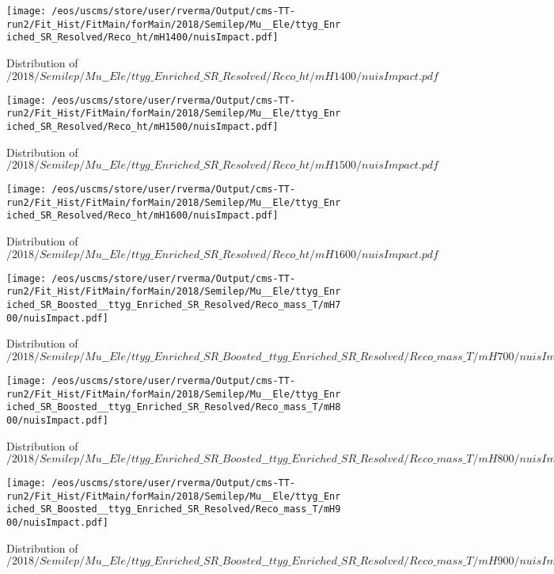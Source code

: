 \begin{figure}
\centering
\texttt{[image: /eos/uscms/store/user/rverma/Output/cms-TT-run2/Fit\_Hist/FitMain/forMain/2018/Semilep/Mu\_\_Ele/ttyg\_Enriched\_SR\_Resolved/Reco\_ht/mH1400/nuisImpact.pdf]}
\caption{Distribution of $/2018/Semilep/Mu\_\_Ele/ttyg\_Enriched\_SR\_Resolved/Reco\_ht/mH1400/nuisImpact.pdf$}
\end{figure}

\begin{figure}
\centering
\texttt{[image: /eos/uscms/store/user/rverma/Output/cms-TT-run2/Fit\_Hist/FitMain/forMain/2018/Semilep/Mu\_\_Ele/ttyg\_Enriched\_SR\_Resolved/Reco\_ht/mH1500/nuisImpact.pdf]}
\caption{Distribution of $/2018/Semilep/Mu\_\_Ele/ttyg\_Enriched\_SR\_Resolved/Reco\_ht/mH1500/nuisImpact.pdf$}
\end{figure}

\begin{figure}
\centering
\texttt{[image: /eos/uscms/store/user/rverma/Output/cms-TT-run2/Fit\_Hist/FitMain/forMain/2018/Semilep/Mu\_\_Ele/ttyg\_Enriched\_SR\_Resolved/Reco\_ht/mH1600/nuisImpact.pdf]}
\caption{Distribution of $/2018/Semilep/Mu\_\_Ele/ttyg\_Enriched\_SR\_Resolved/Reco\_ht/mH1600/nuisImpact.pdf$}
\end{figure}

\begin{figure}
\centering
\texttt{[image: /eos/uscms/store/user/rverma/Output/cms-TT-run2/Fit\_Hist/FitMain/forMain/2018/Semilep/Mu\_\_Ele/ttyg\_Enriched\_SR\_Boosted\_\_ttyg\_Enriched\_SR\_Resolved/Reco\_mass\_T/mH700/nuisImpact.pdf]}
\caption{Distribution of $/2018/Semilep/Mu\_\_Ele/ttyg\_Enriched\_SR\_Boosted\_\_ttyg\_Enriched\_SR\_Resolved/Reco\_mass\_T/mH700/nuisImpact.pdf$}
\end{figure}

\begin{figure}
\centering
\texttt{[image: /eos/uscms/store/user/rverma/Output/cms-TT-run2/Fit\_Hist/FitMain/forMain/2018/Semilep/Mu\_\_Ele/ttyg\_Enriched\_SR\_Boosted\_\_ttyg\_Enriched\_SR\_Resolved/Reco\_mass\_T/mH800/nuisImpact.pdf]}
\caption{Distribution of $/2018/Semilep/Mu\_\_Ele/ttyg\_Enriched\_SR\_Boosted\_\_ttyg\_Enriched\_SR\_Resolved/Reco\_mass\_T/mH800/nuisImpact.pdf$}
\end{figure}

\begin{figure}
\centering
\texttt{[image: /eos/uscms/store/user/rverma/Output/cms-TT-run2/Fit\_Hist/FitMain/forMain/2018/Semilep/Mu\_\_Ele/ttyg\_Enriched\_SR\_Boosted\_\_ttyg\_Enriched\_SR\_Resolved/Reco\_mass\_T/mH900/nuisImpact.pdf]}
\caption{Distribution of $/2018/Semilep/Mu\_\_Ele/ttyg\_Enriched\_SR\_Boosted\_\_ttyg\_Enriched\_SR\_Resolved/Reco\_mass\_T/mH900/nuisImpact.pdf$}
\end{figure}

